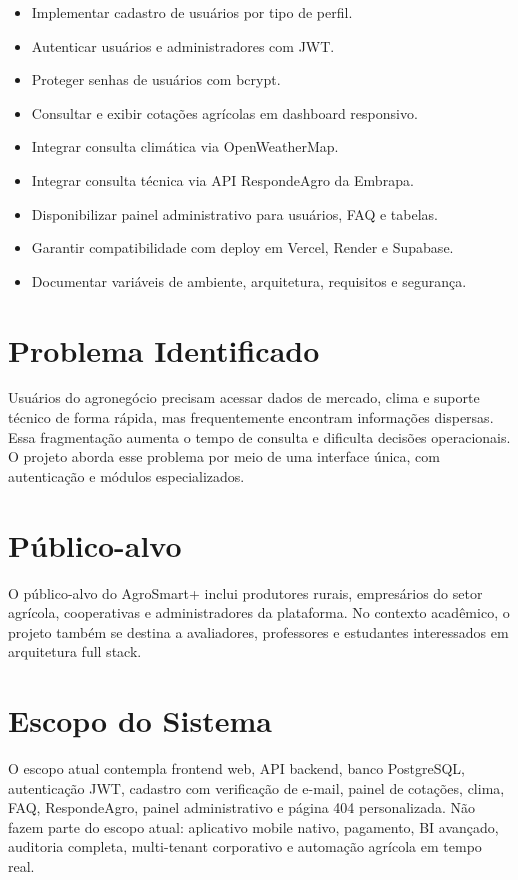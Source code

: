 \documentclass[
  12pt,
  oneside,
  a4paper,
  brazil
]{abntex2}
\begin{document}
\begin{itemize}
  \item Implementar cadastro de usuários por tipo de perfil.
  \item Autenticar usuários e administradores com JWT.
  \item Proteger senhas de usuários com bcrypt.
  \item Consultar e exibir cotações agrícolas em dashboard responsivo.
  \item Integrar consulta climática via OpenWeatherMap.
  \item Integrar consulta técnica via API RespondeAgro da Embrapa.
  \item Disponibilizar painel administrativo para usuários, FAQ e tabelas.
  \item Garantir compatibilidade com deploy em Vercel, Render e Supabase.
  \item Documentar variáveis de ambiente, arquitetura, requisitos e segurança.
\end{itemize}

\section{Problema Identificado}

Usuários do agronegócio precisam acessar dados de mercado, clima e suporte técnico de forma rápida, mas frequentemente encontram informações dispersas. Essa fragmentação aumenta o tempo de consulta e dificulta decisões operacionais. O projeto aborda esse problema por meio de uma interface única, com autenticação e módulos especializados.

\section{Público-alvo}

O público-alvo do AgroSmart+ inclui produtores rurais, empresários do setor agrícola, cooperativas e administradores da plataforma. No contexto acadêmico, o projeto também se destina a avaliadores, professores e estudantes interessados em arquitetura full stack.

\section{Escopo do Sistema}

O escopo atual contempla frontend web, API backend, banco PostgreSQL, autenticação JWT, cadastro com verificação de e-mail, painel de cotações, clima, FAQ, RespondeAgro, painel administrativo e página 404 personalizada. Não fazem parte do escopo atual: aplicativo mobile nativo, pagamento, BI avançado, auditoria completa, multi-tenant corporativo e automação agrícola em tempo real.
\end{document}
